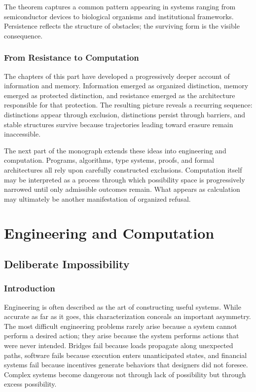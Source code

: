\documentclass[11pt,oneside]{book}
\theoremstyle{plain}
\theoremstyle{definition}
\theoremstyle{remark}
\begin{document}
The theorem captures a common pattern appearing in systems ranging from semiconductor devices to biological organisms and institutional frameworks. Persistence reflects the structure of obstacles; the surviving form is the visible consequence.

\section{From Resistance to Computation}

The chapters of this part have developed a progressively deeper account of information and memory. Information emerged as organized distinction, memory emerged as protected distinction, and resistance emerged as the architecture responsible for that protection. The resulting picture reveals a recurring sequence: distinctions appear through exclusion, distinctions persist through barriers, and stable structures survive because trajectories leading toward erasure remain inaccessible.

The next part of the monograph extends these ideas into engineering and computation. Programs, algorithms, type systems, proofs, and formal architectures all rely upon carefully constructed exclusions. Computation itself may be interpreted as a process through which possibility space is progressively narrowed until only admissible outcomes remain. What appears as calculation may ultimately be another manifestation of organized refusal.

\part{Engineering and Computation}

\chapter{Deliberate Impossibility}

\section{Introduction}

Engineering is often described as the art of constructing useful systems. While accurate as far as it goes, this characterization conceals an important asymmetry. The most difficult engineering problems rarely arise because a system cannot perform a desired action; they arise because the system performs actions that were never intended. Bridges fail because loads propagate along unexpected paths, software fails because execution enters unanticipated states, and financial systems fail because incentives generate behaviors that designers did not foresee. Complex systems become dangerous not through lack of possibility but through excess possibility.
\end{document}
